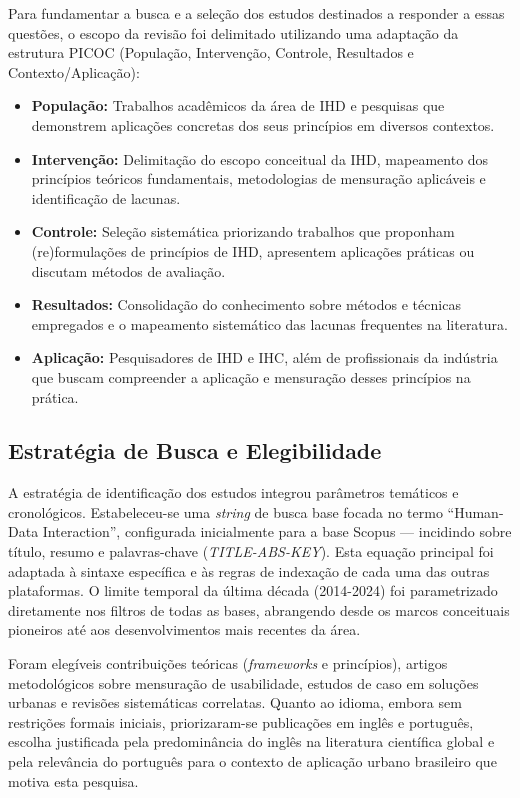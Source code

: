 \documentclass[12pt]{article}
\begin{document}
Para fundamentar a busca e a seleção dos estudos destinados a responder a essas questões, o escopo da revisão foi delimitado utilizando uma adaptação da estrutura PICOC (População, Intervenção, Controle, Resultados e Contexto/Aplicação):

\begin{itemize}
\item \textbf{População:} Trabalhos acadêmicos da área de IHD e pesquisas que demonstrem aplicações concretas dos seus princípios em diversos contextos.
\item \textbf{Intervenção:} Delimitação do escopo conceitual da IHD, mapeamento dos princípios teóricos fundamentais, metodologias de mensuração aplicáveis e identificação de lacunas.
\item \textbf{Controle:} Seleção sistemática priorizando trabalhos que proponham (re)formulações de princípios de IHD, apresentem aplicações práticas ou discutam métodos de avaliação.
\item \textbf{Resultados:} Consolidação do conhecimento sobre métodos e técnicas empregados e o mapeamento sistemático das lacunas frequentes na literatura.
\item \textbf{Aplicação:} Pesquisadores de IHD e IHC, além de profissionais da indústria que buscam compreender a aplicação e mensuração desses princípios na prática.
\end{itemize}

\subsection{Estratégia de Busca e Elegibilidade}
\label{estrategiaDeBusca}

A estratégia de identificação dos estudos integrou parâmetros temáticos e cronológicos. Estabeleceu-se uma \textit{string} de busca base focada no termo ``Human-Data Interaction'', configurada inicialmente para a base Scopus — incidindo sobre título, resumo e palavras-chave (\textit{TITLE-ABS-KEY}). Esta equação principal foi adaptada à sintaxe específica e às regras de indexação de cada uma das outras plataformas. O limite temporal da última década (2014-2024) foi parametrizado diretamente nos filtros de todas as bases, abrangendo desde os marcos conceituais pioneiros até aos desenvolvimentos mais recentes da área.

Foram elegíveis contribuições teóricas (\textit{frameworks} e princípios), artigos metodológicos sobre mensuração de usabilidade, estudos de caso em soluções urbanas e revisões sistemáticas correlatas. Quanto ao idioma, embora sem restrições formais iniciais, priorizaram-se publicações em inglês e português, escolha justificada pela predominância do inglês na literatura científica global e pela relevância do português para o contexto de aplicação urbano brasileiro que motiva esta pesquisa.
\end{document}
